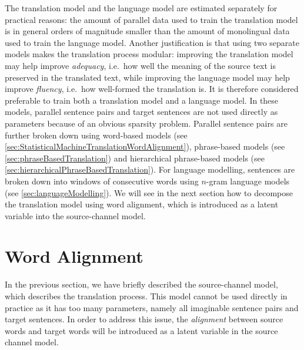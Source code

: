 The translation model and the language model are estimated separately
for practical reasons: the amount of parallel data used to train the translation
model is in general orders of magnitude smaller than the amount of monolingual
data used to train the language model. Another justification is that
using two separate models makes the translation process modular: improving
the translation model may help improve \emph{adequacy}, i.e.\ how well the meaning
of the source text is preserved in the translated text, while improving
the language model may help improve \emph{fluency}, i.e.\ how well-formed the
translation is. It is therefore considered
preferable to train both a translation model and a language model.
In these models, parallel sentence pairs and target sentences are
not used directly as parameters because of an obvious sparsity
problem. Parallel sentence pairs are further broken down using
word-based models (see \autoref{sec:StatisticalMachineTranslationWordAlignment}),
phrase-based models (see \autoref{sec:phraseBasedTranslation})
and hierarchical phrase-based models
(see \autoref{sec:hierarchicalPhraseBasedTranslation}). For language
modelling, sentences are broken down into windows of consecutive
words using $n$-gram language models (see \autoref{sec:languageModelling}).
We will see in the next section how to decompose
the translation model using word alignment, which is
introduced as a latent variable into the source-channel model.

\section{Word Alignment}
\label{sec:StatisticalMachineTranslationWordAlignment}

In the previous section, we have briefly described the source-channel model, which
describes the translation process. This model cannot be used directly in
practice as it has too many parameters, namely all imaginable
sentence pairs and target sentences. In order to address this issue,
the \emph{alignment} between source words and target words will be
introduced as a latent variable in the source channel model.

